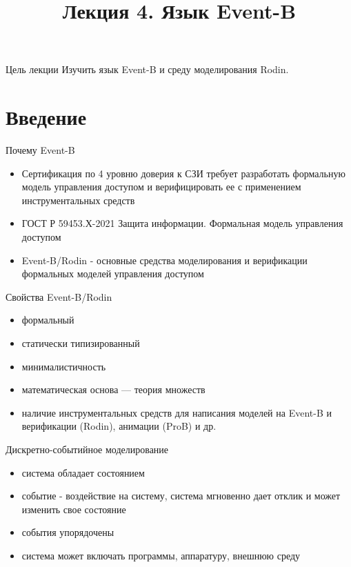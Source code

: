 \documentclass[hyperref={unicode=true}]{beamer}
\title{Лекция 4. Язык Event-B}
\author{}
\date{}
\begin{document}
	\begin{frame}{}
		\titlepage
	\end{frame}

    \begin{frame}{Цель лекции}
    Изучить язык Event-B и среду моделирования Rodin.
    \end{frame}

    \section{Введение}

	\begin{frame}{Почему Event-B}
    \begin{itemize}
		\item Сертификация по 4 уровню доверия к СЗИ требует 
		      разработать формальную модель управления доступом
			  и верифицировать ее с применением инструментальных
			  средств
		\item ГОСТ Р 59453.Х-2021 Защита информации. Формальная
		      модель управления доступом
		\item Event-B/Rodin - основные средства моделирования
			  и верификации формальных моделей управления доступом
	\end{itemize}
    \end{frame}

	\begin{frame}{Свойства Event-B/Rodin}
		\begin{itemize}
			\item формальный
			\item статически типизированный
			\item минималистичность
			\item математическая основа --- теория множеств
			\item наличие инструментальных средств для написания
			      моделей на Event-B и верификации (Rodin),
				  анимации (ProB) и др.
		\end{itemize}
	\end{frame}

	\begin{frame}{Дискретно-событийное моделирование}
		\begin{itemize}
			\item система обладает состоянием
			\item событие - воздействие на систему,
					система мгновенно дает отклик
					и может изменить свое состояние
			\item события упорядочены
			\item система может включать программы,
				  аппаратуру, внешнюю среду
		\end{itemize}
	\end{frame}
\end{document}
